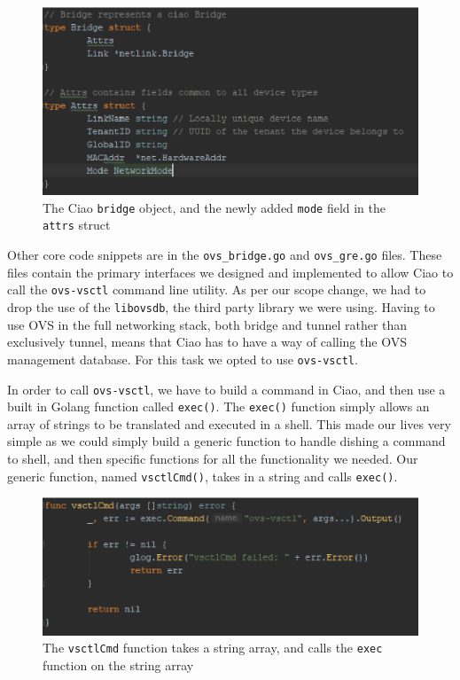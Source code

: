\documentclass[10pt,onecolumn,journal,draftclsnofoot]{IEEEtran}
\begin{document}
\begin{figure}[H]
	\caption{The Ciao \texttt{bridge} object, and the newly added \texttt{mode}
	field in the \texttt{attrs} struct}
\includegraphics[scale=0.75]{./bridge.eps}
\end{figure}

Other core code snippets are in the \texttt{ovs\_bridge.go} and \texttt{ovs\_gre.go}
files. These files contain the primary interfaces we designed and implemented
to allow Ciao to call the \texttt{ovs-vsctl} command line utility. As per our
scope change, we had to drop the use of the \texttt{libovsdb}, the third party
library we were using. Having to use OVS in the full networking stack, both 
bridge and tunnel rather than exclusively tunnel, means that Ciao has to have
a way of calling the OVS management database. For this task we opted to use 
\texttt{ovs-vsctl}. 

In order to call \texttt{ovs-vsctl}, we have to build a command in Ciao, and
then use a built in Golang function called \texttt{exec()}. The \texttt{exec()}
function simply allows an array of strings to be translated and executed in a
shell. This made our lives very simple as we could simply build a generic function
to handle dishing a command to shell, and then specific functions for all the
functionality we needed. Our generic function, named \texttt{vsctlCmd()}, takes
in a string and calls \texttt{exec()}. 

\begin{figure}[H]
	\caption{The \texttt{vsctlCmd} function takes a string array, and calls
	the \texttt{exec} function on the string array}
\includegraphics[scale=0.75]{./vsctlcmd.eps}
\end{figure}
\end{document}
